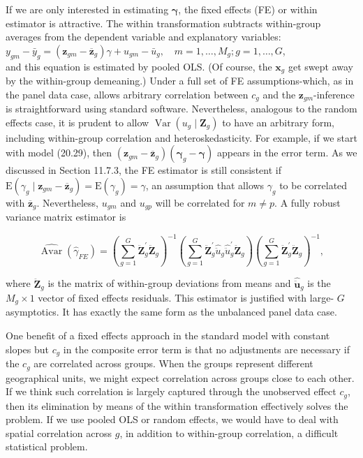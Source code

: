 \documentclass[10pt]{article}
\begin{document}
If we are only interested in estimating $\boldsymbol{\gamma}$, the fixed effects (FE) or within estimator is attractive. The within transformation subtracts within-group averages from the dependent variable and explanatory variables:\\
$y_{g m}-\bar{y}_{g}=\left(\mathbf{z}_{g m}-\overline{\mathbf{z}}_{g}\right) \gamma+u_{g m}-\bar{u}_{g}, \quad m=1, \ldots, M_{g} ; g=1, \ldots, G$,\\
and this equation is estimated by pooled OLS. (Of course, the $\mathbf{x}_{g}$ get swept away by the within-group demeaning.) Under a full set of FE assumptions-which, as in the panel data case, allows arbitrary correlation between $c_{g}$ and the $\mathbf{z}_{g m}$-inference is straightforward using standard software. Nevertheless, analogous to the random effects case, it is prudent to allow $\operatorname{Var}\left(u_{g} \mid \mathbf{Z}_{g}\right)$ to have an arbitrary form, including within-group correlation and heteroskedasticity. For example, if we start with model (20.29), then $\left(\mathbf{z}_{g m}-\overline{\mathbf{z}}_{g}\right)\left(\boldsymbol{\gamma}_{g}-\boldsymbol{\gamma}\right)$ appears in the error term. As we discussed in Section 11.7.3, the FE estimator is still consistent if $\mathrm{E}\left(\gamma_{g} \mid \mathbf{z}_{g m}-\overline{\mathbf{z}}_{g}\right)=\mathrm{E}\left(\gamma_{g}\right)=\gamma$, an assumption that allows $\gamma_{g}$ to be correlated with $\overline{\mathbf{z}}_{g}$. Nevertheless, $u_{g m}$ and $u_{g p}$ will be correlated for $m \neq p$. A fully robust variance matrix estimator is


\begin{equation*}
\widehat{\operatorname{Avar}}\left(\hat{\gamma}_{F E}\right)=\left(\sum_{g=1}^{G} \ddot{\mathbf{Z}}_{g}^{\prime} \ddot{\mathbf{Z}}_{g}\right)^{-1}\left(\sum_{g=1}^{G} \ddot{\mathbf{Z}}_{g}^{\prime} \hat{\ddot{u}}_{g} \hat{\ddot{u}}_{g}^{\prime} \ddot{\mathbf{Z}}_{g}\right)\left(\sum_{g=1}^{G} \ddot{\mathbf{Z}}_{g}^{\prime} \ddot{\mathbf{Z}}_{g}\right)^{-1}, \tag{20.31}
\end{equation*}


where $\ddot{\mathbf{Z}}_{g}$ is the matrix of within-group deviations from means and $\hat{\ddot{\mathbf{u}}}_{g}$ is the $M_{g} \times 1$ vector of fixed effects residuals. This estimator is justified with large- $G$ asymptotics. It has exactly the same form as the unbalanced panel data case.

One benefit of a fixed effects approach in the standard model with constant slopes but $c_{g}$ in the composite error term is that no adjustments are necessary if the $c_{g}$ are correlated across groups. When the groups represent different geographical units, we might expect correlation across groups close to each other. If we think such correlation is largely captured through the unobserved effect $c_{g}$, then its elimination by means of the within transformation effectively solves the problem. If we use pooled OLS or random effects, we would have to deal with spatial correlation across $g$, in addition to within-group correlation, a difficult statistical problem.
\end{document}
